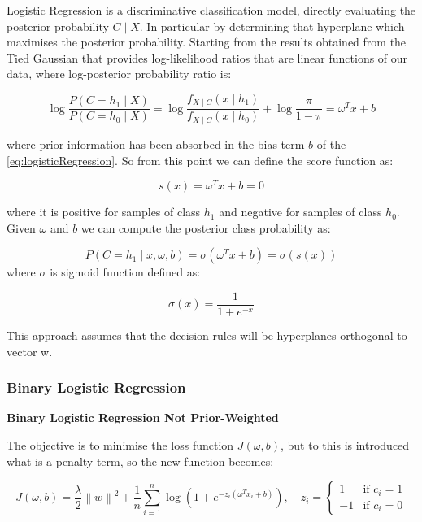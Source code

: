 
Logistic Regression is a discriminative classification model, directly evaluating the posterior probability \(C \mid X\).
In particular by determining that hyperplane which maximises the posterior probability.
Starting from the results obtained from the Tied Gaussian that provides log-likelihood ratios that are linear functions
of our data, where log-posterior probability ratio is:

\begin{equation}
    \log \frac{P(C=h_1 \mid X)}{P(C=h_0 \mid X)} = \log \frac{f_{X \mid C}(x \mid h_1)}{f_{X \mid C}(x \mid h_0)} + \log \frac{\pi}{1-\pi} = \omega^T x + b
    \label{eq:logisticRegression}
\end{equation}

where prior information has been absorbed in the bias term \(b\) of the \autoref{eq:logisticRegression}.
So from this point we can define the score function as:

\begin{equation}
    s(x) = \omega^T x + b = 0
    \label{eq:scoreFunctionLR}
\end{equation}

where it is positive for samples of class \(h_1\) and negative for samples of class \(h_0\).
Given \(\omega\) and \(b\) we can compute the posterior class probability as:

\begin{equation}
    P(C=h_1 \mid x, \omega, b) = \sigma(\omega^T x + b) = \sigma(s(x))
    \label{eq:posteriorClassProbabilityLR}
\end{equation}
where \(\sigma\) is sigmoid function defined as:

\begin{equation}
    \sigma(x) = \frac{1}{1 + e^{-x}}
\end{equation}

This approach assumes that the decision rules will be hyperplanes orthogonal to vector w.

\subsubsection{Binary Logistic Regression}
\textbf{Binary Logistic Regression Not Prior-Weighted}\par
The objective is to minimise the loss function \(J(\omega,b)\), but to this is introduced what is a penalty term,
so the new function becomes:

\begin{equation}
    J(\omega,b) = \frac{\lambda}{2}\left\|w \right\|^2 + \frac{1}{n} \sum_{i=1}^{n} \log (1+e^{-z_i(\omega^T x_i + b)}), \quad
    z_i = \begin{cases}
              1 & \text{if } c_i = 1 \\
              -1 & \text{if } c_i = 0
    \end{cases}
    \label{eq:minimiseFunctionLR}
\end{equation}

